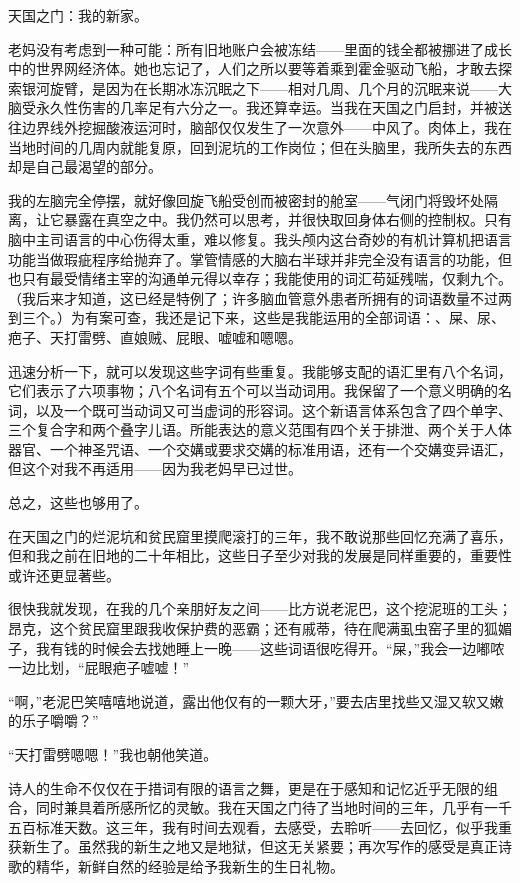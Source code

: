 \documentclass[AutoFakeBold=true]{book}
\begin{document}
天国之门：我的新家。

老妈没有考虑到一种可能：所有旧地账户会被冻结——里面的钱全都被挪进了成长中的世界网经济体。她也忘记了，人们之所以要等着乘到霍金驱动飞船，才敢去探索银河旋臂，是因为在长期冰冻沉眠之下——相对几周、几个月的沉眠来说——大脑受永久性伤害的几率足有六分之一。我还算幸运。当我在天国之门启封，并被送往边界线外挖掘酸液运河时，脑部仅仅发生了一次意外——中风了。肉体上，我在当地时间的几周内就能复原，回到泥坑的工作岗位；但在头脑里，我所失去的东西却是自己最渴望的部分。

我的左脑完全停摆，就好像回旋飞船受创而被密封的舱室——气闭门将毁坏处隔离，让它暴露在真空之中。我仍然可以思考，并很快取回身体右侧的控制权。只有脑中主司语言的中心伤得太重，难以修复。我头颅内这台奇妙的有机计算机把语言功能当做瑕疵程序给抛弃了。掌管情感的大脑右半球并非完全没有语言的功能，但也只有最受情绪主宰的沟通单元得以幸存；我能使用的词汇苟延残喘，仅剩九个。（我后来才知道，这已经是特例了；许多脑血管意外患者所拥有的词语数量不过两到三个。）为有案可查，我还是记下来，这些是我能运用的全部词语：、屎、尿、疤子、天打雷劈、直娘贼、屁眼、嘘嘘和嗯嗯。

迅速分析一下，就可以发现这些字词有些重复。我能够支配的语汇里有八个名词，它们表示了六项事物；八个名词有五个可以当动词用。我保留了一个意义明确的名词，以及一个既可当动词又可当虚词的形容词。这个新语言体系包含了四个单字、三个复合字和两个叠字儿语。所能表达的意义范围有四个关于排泄、两个关于人体器官、一个神圣咒语、一个交媾或要求交媾的标准用语，还有一个交媾变异语汇，但这个对我不再适用——因为我老妈早已过世。

总之，这些也够用了。

在天国之门的烂泥坑和贫民窟里摸爬滚打的三年，我不敢说那些回忆充满了喜乐，但和我之前在旧地的二十年相比，这些日子至少对我的发展是同样重要的，重要性或许还更显著些。

很快我就发现，在我的几个亲朋好友之间——比方说老泥巴，这个挖泥班的工头；昂克，这个贫民窟里跟我收保护费的恶霸；还有戚蒂，待在爬满虱虫窑子里的狐媚子，我有钱的时候会去找她睡上一晚——这些词语很吃得开。``屎，''我会一边嘟哝一边比划，``屁眼疤子嘘嘘！''

``啊，''老泥巴笑嘻嘻地说道，露出他仅有的一颗大牙，''要去店里找些又湿又软又嫩的乐子嚼嚼？''

``天打雷劈嗯嗯！''我也朝他笑道。

\vspace*{1em}

诗人的生命不仅仅在于措词有限的语言之舞，更是在于感知和记忆近乎无限的组合，同时兼具着所感所忆的灵敏。我在天国之门待了当地时间的三年，几乎有一千五百标准天数。这三年，我有时间去观看，去感受，去聆听——去回忆，似乎我重获新生了。虽然我的新生之地又是地狱，但这无关紧要；再次写作的感受是真正诗歌的精华，新鲜自然的经验是给予我新生的生日礼物。
\end{document}
